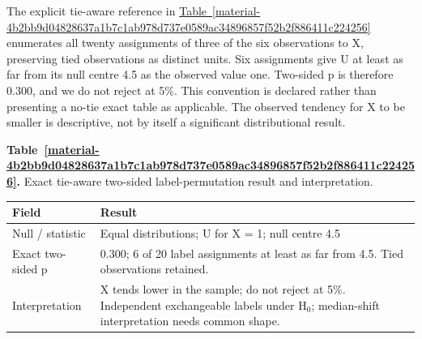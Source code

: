 \documentclass[11pt,a4paper]{article}
\newcounter{scripttable}
\begin{document}
\medskip

The explicit tie-aware reference in \hyperref[material-4b2bb9d04828637a1b7c1ab978d737e0589ac34896857f52b2f886411c224256]{Table~\ref*{material-4b2bb9d04828637a1b7c1ab978d737e0589ac34896857f52b2f886411c224256}} enumerates all twenty assignments of three of the six observations to X, preserving tied observations as distinct units. Six assignments give U at least as far from its null centre 4.5 as the observed value one. Two-sided p is therefore 0.300, and we do not reject at 5\%. This convention is declared rather than presenting a no-tie exact table as applicable. The observed tendency for X to be smaller is descriptive, not by itself a significant distributional result.


\par\medskip
{}
\label{material-4b2bb9d04828637a1b7c1ab978d737e0589ac34896857f52b2f886411c224256}
\noindent\textbf{Table~\ref*{material-4b2bb9d04828637a1b7c1ab978d737e0589ac34896857f52b2f886411c224256}.} Exact tie-aware two-sided label-permutation result and interpretation.\par\nopagebreak
\begin{longtable}{@{}p{}p{}@{}}
Field & Result \\ \hline
\endhead
Null / statistic & Equal distributions; U for X = 1; null centre 4.5 \\ \hline
Exact two-sided p & 0.300; 6 of 20 label assignments at least as far from 4.5. Tied observations retained. \\ \hline
Interpretation & X tends lower in the sample; do not reject at 5\%. Independent exchangeable labels under H\ensuremath{{}_0}; median-shift interpretation needs common shape. \\ \hline
\end{longtable}
\medskip
\end{document}
